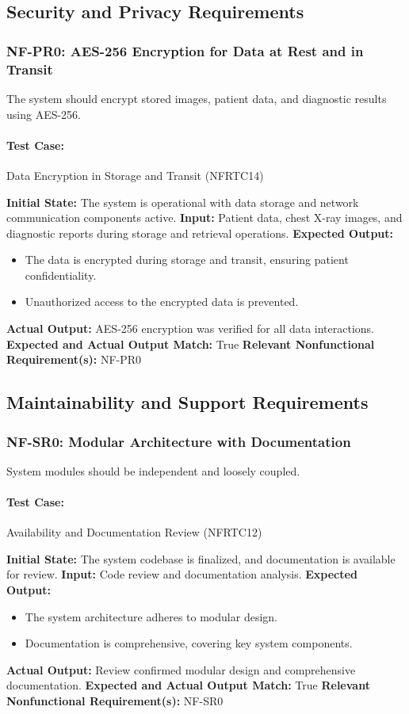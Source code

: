 \documentclass[12pt, titlepage]{article}
\begin{document}
\subsection{Security and Privacy Requirements}

\subsubsection{NF-PR0: AES-256 Encryption for Data at Rest and in Transit}
The system should encrypt stored images, patient data, and diagnostic results using AES-256.

\paragraph{Test Case:} Data Encryption in Storage and Transit (NFRTC14)

\textbf{Initial State:} The system is operational with data storage and network communication components active.  
\textbf{Input:} Patient data, chest X-ray images, and diagnostic reports during storage and retrieval operations.  
\textbf{Expected Output:}
\begin{itemize}
    \item The data is encrypted during storage and transit, ensuring patient confidentiality.
    \item Unauthorized access to the encrypted data is prevented.
\end{itemize}
\textbf{Actual Output:} AES-256 encryption was verified for all data interactions.  
\textbf{Expected and Actual Output Match:} True  
\textbf{Relevant Nonfunctional Requirement(s):} NF-PR0  

\subsection{Maintainability and Support Requirements}

\subsubsection{NF-SR0: Modular Architecture with Documentation}
System modules should be independent and loosely coupled.

\paragraph{Test Case:} Availability and Documentation Review (NFRTC12)

\textbf{Initial State:} The system codebase is finalized, and documentation is available for review.  
\textbf{Input:} Code review and documentation analysis.  
\textbf{Expected Output:}
\begin{itemize}
    \item The system architecture adheres to modular design.
    \item Documentation is comprehensive, covering key system components.
\end{itemize}
\textbf{Actual Output:} Review confirmed modular design and comprehensive documentation.  
\textbf{Expected and Actual Output Match:} True  
\textbf{Relevant Nonfunctional Requirement(s):} NF-SR0  
\end{document}
